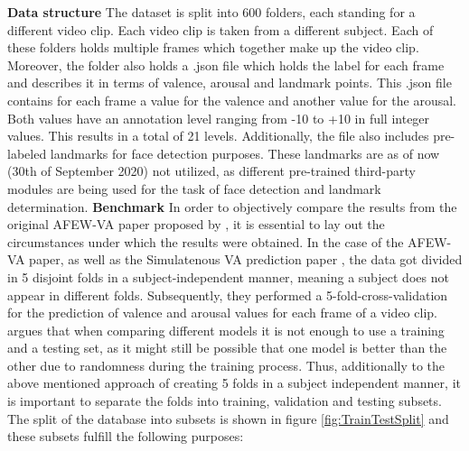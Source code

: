 \textbf{Data structure}
\newline
The dataset is split into 600 folders, each standing for a different video clip. Each video clip is taken from a different subject. Each of these folders holds multiple frames which together make up the video clip. Moreover, the folder also holds a .json file which holds the label for each frame and describes it in terms of valence, arousal and landmark points.
\newline\newline
This .json file contains for each frame a value for the valence and another value for the arousal. Both values have an annotation level ranging from -10 to +10 in full integer values. This results in a total of 21 levels.\citep{Kossaifi:2017:AFEW-VADatabase} Additionally, the file also includes pre-labeled landmarks for face detection purposes. These landmarks are as of now (30th of September 2020) not utilized, as different pre-trained third-party modules are being used for the task of face detection and landmark determination.
\newline\newline
\textbf{Benchmark}
\newline
In order to objectively compare the results from the original AFEW-VA paper proposed by \citet{Kossaifi:2017:AFEW-VADatabase}, it is essential to lay out the circumstances under which the results were obtained. In the case of the AFEW-VA paper\citep{Kossaifi:2017:AFEW-VADatabase}, as well as the Simulatenous VA prediction paper \citep{Handrich:2020:SimultaneousPredVA}, the data got divided in 5 disjoint folds in a subject-independent manner, meaning a subject does not appear in different folds. Subsequently, they performed a 5-fold-cross-validation for the prediction of valence and arousal values for each frame of a video clip.\citep{Kossaifi:2017:AFEW-VADatabase}
\newline\newline
\citet{Roehrich:2020:TrainValidateTest} argues that when comparing different models it is not enough to use a training and a testing set, as it might still be possible that one model is better than the other due to randomness during the training process. Thus, additionally to the above mentioned approach of creating 5 folds in a subject independent manner, it is important to separate the folds into training, validation and testing subsets. The split of the database into subsets is shown in figure \ref{fig:TrainTestSplit} and these subsets fulfill the following purposes:

